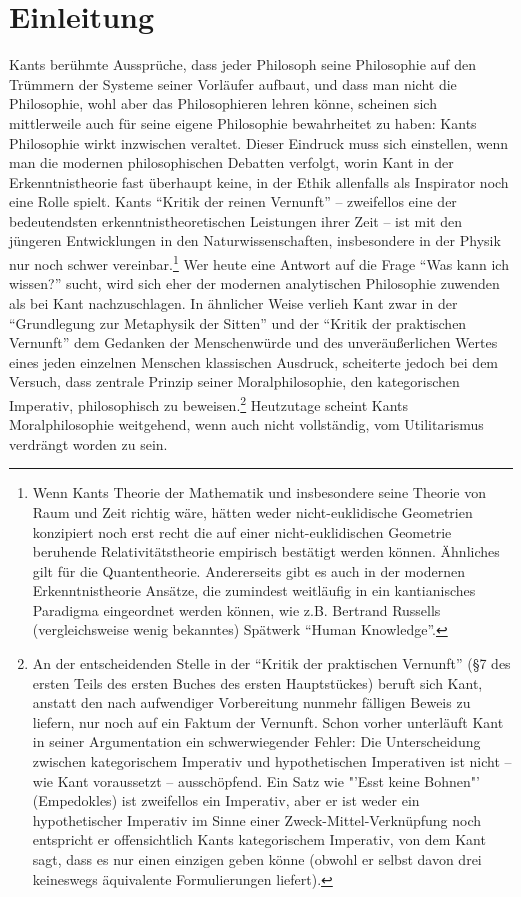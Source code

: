 \documentclass[12pt,a4paper,ngerman]{article}
\begin{document}
\newpage

\tableofcontents

\section{Einleitung}

Kants berühmte Aussprüche, dass jeder Philosoph seine Philosophie auf
den Trümmern der Systeme seiner Vorläufer aufbaut, und dass man nicht
die Philosophie, wohl aber das Philosophieren lehren könne, scheinen
sich mittlerweile auch für seine eigene Philosophie bewahrheitet zu
haben: Kants Philosophie wirkt inzwischen veraltet. Dieser Eindruck
muss sich einstellen, wenn man die modernen philosophischen Debatten
verfolgt, worin Kant in der Erkenntnistheorie fast überhaupt keine, in
der Ethik allenfalls als Inspirator noch eine Rolle spielt.  Kants
"`Kritik der reinen Vernunft"' -- zweifellos eine der bedeutendsten
erkenntnistheoretischen Leistungen ihrer Zeit -- ist mit den jüngeren
Entwicklungen in den Naturwissenschaften, insbesondere in der Physik
nur noch schwer vereinbar.\footnote{Wenn Kants Theorie der Mathematik
  und insbesondere seine Theorie von Raum und Zeit richtig wäre,
  hätten weder nicht-euklidische Geometrien konzipiert noch erst recht
  die auf einer nicht-euklidischen Geometrie beruhende
  Relativitätstheorie empirisch bestätigt werden können. Ähnliches
  gilt für die Quantentheorie. Andererseits gibt es auch in der
  modernen Erkenntnistheorie Ansätze, die zumindest weitläufig in ein
  kantianisches Paradigma eingeordnet werden können, wie z.B. Bertrand
  Russells (vergleichsweise wenig bekanntes) Spätwerk "`Human
  Knowledge"'.} Wer heute eine Antwort auf die Frage "`Was kann ich
wissen?"' sucht, wird sich eher der modernen analytischen Philosophie
zuwenden als bei Kant nachzuschlagen. In ähnlicher Weise verlieh Kant
zwar in der "`Grundlegung zur Metaphysik der Sitten"' und der "`Kritik
der praktischen Vernunft"' dem Gedanken der Menschenwürde und des
unveräußerlichen Wertes eines jeden einzelnen Menschen klassischen
Ausdruck, scheiterte jedoch bei dem Versuch, dass zentrale Prinzip
seiner Moralphilosophie, den kategorischen Imperativ, philosophisch zu
beweisen.\footnote{An der entscheidenden Stelle in der "`Kritik der
  praktischen Vernunft"' (§7 des ersten Teils des ersten Buches des
  ersten Hauptstückes) beruft sich Kant, anstatt den nach aufwendiger
  Vorbereitung nunmehr fälligen Beweis zu liefern, nur noch auf ein
  Faktum der Vernunft.  Schon vorher unterläuft Kant in seiner
  Argumentation ein schwerwiegender Fehler: Die Unterscheidung
  zwischen kategorischem Imperativ und hypothetischen Imperativen ist
  nicht -- wie Kant voraussetzt -- ausschöpfend. Ein Satz wie "'Esst
  keine Bohnen"' (Empedokles) ist zweifellos ein Imperativ, aber er
  ist weder ein hypothetischer Imperativ im Sinne einer
  Zweck-Mittel-Verknüpfung noch entspricht er offensichtlich Kants
  kategorischem Imperativ, von dem Kant sagt, dass es nur einen
  einzigen geben könne (obwohl er selbst davon drei keineswegs
  äquivalente Formulierungen liefert).}  Heutzutage scheint Kants
Moralphilosophie weitgehend, wenn auch nicht vollständig, vom
Utilitarismus verdrängt worden zu sein.
\end{document}
